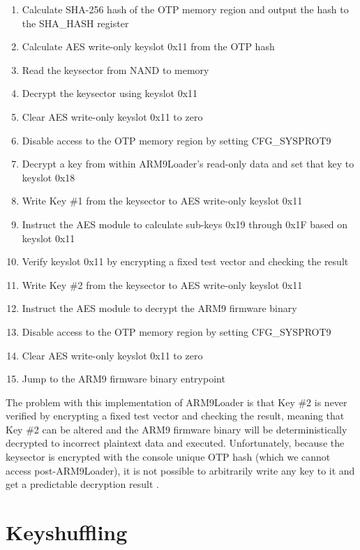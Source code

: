 \documentclass[journal]{IEEEtran}
\begin{document}
\medskip
\begin{enumerate}
  \item Calculate SHA-256 hash of the OTP memory region and output the hash to
  the SHA\_HASH register
  \item Calculate AES write-only keyslot 0x11 from the OTP hash
  \item Read the keysector from NAND to memory
  \item Decrypt the keysector using keyslot 0x11
  \item Clear AES write-only keyslot 0x11 to zero
  \item Disable access to the OTP memory region by setting CFG\_SYSPROT9
  \item Decrypt a key from within ARM9Loader's read-only data and set that key
  to keyslot 0x18
  \item Write Key \#1 from the keysector to AES write-only keyslot 0x11
  \item Instruct the AES module to calculate sub-keys 0x19 through 0x1F based on
  keyslot 0x11
  \item Verify keyslot 0x11 by encrypting a fixed test vector and checking the
  result
  \item Write Key \#2 from the keysector to AES write-only keyslot 0x11
  \item Instruct the AES module to decrypt the ARM9 firmware binary
  \item Disable access to the OTP memory region by setting CFG\_SYSPROT9
  \item Clear AES write-only keyslot 0x11 to zero
  \item Jump to the ARM9 firmware binary entrypoint
\end{enumerate}
\medskip

The problem with this implementation of ARM9Loader is that Key \#2 is never
verified by encrypting a fixed test vector and checking the result, meaning that
Key \#2 can be altered and the ARM9 firmware binary will be deterministically
decrypted to incorrect plaintext data and executed. Unfortunately, because the
keysector is encrypted with the console unique OTP hash (which we cannot access
post-ARM9Loader), it is not possible to arbitrarily write any key to it and get
a predictable decryption result \cite{3DS_System_Flaws}.

\section{Keyshuffling}
\end{document}
